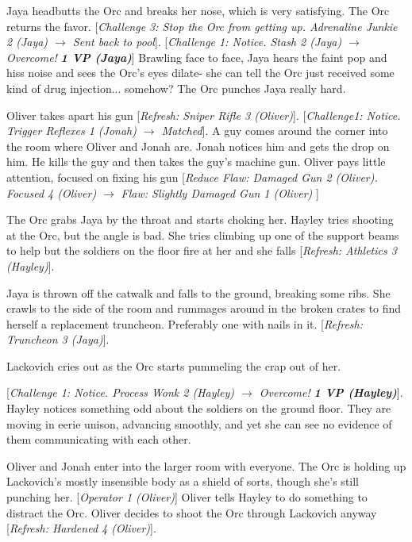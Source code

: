 Jaya headbutts the Orc and breaks her nose, which is very satisfying.  The Orc returns the favor.  {[}\textit{Challenge 3: Stop the Orc from getting up.  Adrenaline Junkie 2 (Jaya) $\rightarrow$ Sent back to pool}{]}.  {[}\textit{Challenge 1: Notice.  Stash 2 (Jaya)  $\rightarrow$ Overcome! }\textit{\textbf{1 VP (Jaya)}}{]}  Brawling face to face, Jaya hears the faint pop and hiss noise and sees the Orc's eyes dilate- she can tell the Orc just received some kind of drug injection... somehow?  The Orc punches Jaya really hard.



Oliver takes apart his gun {[}\textit{Refresh: Sniper Rifle 3 (Oliver)}{]}.   {[}\textit{Challenge1:  Notice.  Trigger Reflexes 1 (Jonah) $\rightarrow$ Matched}{]}.  A guy comes around the corner into the room where Oliver and Jonah are. Jonah notices him and gets the drop on him.  He kills the guy and then takes the guy's machine gun.  Oliver pays little attention, focused on fixing his gun {[}\textit{Reduce Flaw: Damaged Gun 2 (Oliver).  Focused 4 (Oliver) $\rightarrow$ }\textit{ {\color[RGB]{255,0,0}Flaw: Slightly Damaged Gun 1 (Oliver)} }{]}



The Orc grabs Jaya by the throat and starts choking her.  Hayley tries shooting at the Orc, but the angle is bad.  She tries climbing up one of the support beams to help but the soldiers on the floor fire at her and she falls {[}\textit{Refresh: Athletics 3 (Hayley)}{]}.  



Jaya is thrown off the catwalk and falls to the ground, breaking some ribs.  She crawls to the side of the room and rummages around in the broken crates to find herself a replacement truncheon.  Preferably one with nails in it.  {[}\textit{Refresh: Truncheon 3 (Jaya)}{]}. 



Lackovich cries out as the Orc starts pummeling the crap out of her.



{[}\textit{Challenge 1: Notice.  Process Wonk 2 (Hayley)  $\rightarrow$ Overcome! }\textit{\textbf{1 VP (Hayley)}}{]}.  Hayley notices something odd about the soldiers on the ground floor.  They are moving in eerie unison, advancing smoothly, and yet she can see no evidence of them communicating with each other.



Oliver and Jonah enter into the larger room with everyone.  The Orc is holding up Lackovich's mostly insensible body as a shield of sorts, though she's still punching her.  {[}\textit{Operator 1 (Oliver)}{]} Oliver tells Hayley to do something to distract the Orc.  Oliver decides to shoot the Orc through Lackovich anyway {[}\textit{Refresh: Hardened 4 (Oliver)}{]}.



